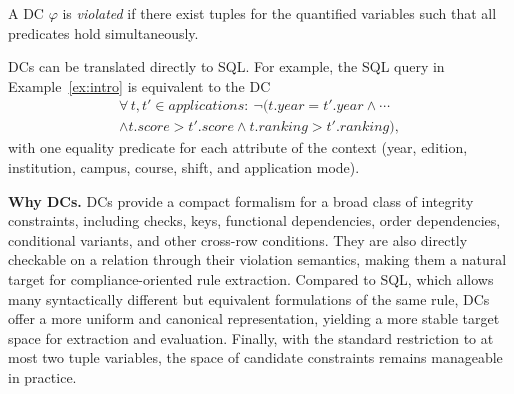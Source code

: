 A DC $\varphi$ is \emph{violated} if there exist tuples for the quantified variables such that all predicates hold simultaneously.

DCs can be translated directly to SQL.
For example, the SQL query in Example~\ref{ex:intro} is equivalent to the DC
\begin{multline*}
\forall\, t, t' \in \mathit{applications}:\ \neg\big(t.\mathit{year}=t'.\mathit{year} \land \cdots \\
\land t.\mathit{score}>t'.\mathit{score} \land t.\mathit{ranking}>t'.\mathit{ranking}\big),
\end{multline*}
with one equality predicate for each attribute of the context (year, edition, institution, campus, course, shift, and application mode).

\smallskip\noindent\textbf{Why DCs.}
DCs provide a compact formalism for a broad class of integrity constraints, including checks, keys, functional dependencies, order dependencies, conditional variants, and other cross-row conditions. They are also directly checkable on a relation through their violation semantics, making them a natural target for compliance-oriented rule extraction. Compared to SQL, which allows many syntactically different but equivalent formulations of the same rule, DCs offer a more uniform and canonical representation, yielding a more stable target space for extraction and evaluation. Finally, with the standard restriction to at most two tuple variables, the space of candidate constraints remains manageable in practice.







